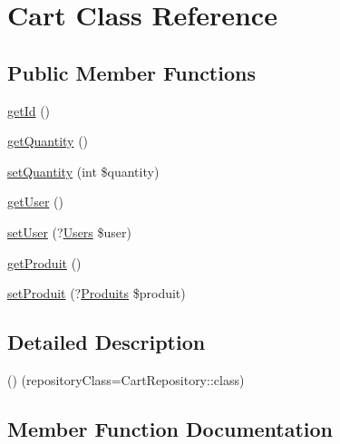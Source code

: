 \hypertarget{class_app_1_1_entity_1_1_cart}{}\section{Cart Class Reference}
\label{class_app_1_1_entity_1_1_cart}
\subsection*{Public Member Functions}
\begin{DoxyCompactItemize}
\item 
\mbox{\hyperlink{class_app_1_1_entity_1_1_cart_a12251d0c022e9e21c137a105ff683f13}{get\+Id}} ()
\item 
\mbox{\hyperlink{class_app_1_1_entity_1_1_cart_abae8ce0df3d9f49efcba4904a2d030a6}{get\+Quantity}} ()
\item 
\mbox{\hyperlink{class_app_1_1_entity_1_1_cart_a6aaf2dab8685fde29dbdf49b782017df}{set\+Quantity}} (int \$quantity)
\item 
\mbox{\hyperlink{class_app_1_1_entity_1_1_cart_ae81b7186fb97a7c6457edcc68c9aa2ef}{get\+User}} ()
\item 
\mbox{\hyperlink{class_app_1_1_entity_1_1_cart_a31170564fe4585dda0eb916f17323681}{set\+User}} (?\mbox{\hyperlink{class_app_1_1_entity_1_1_users}{Users}} \$user)
\item 
\mbox{\hyperlink{class_app_1_1_entity_1_1_cart_aa39b956895038a1e65f2a0ca81fd3398}{get\+Produit}} ()
\item 
\mbox{\hyperlink{class_app_1_1_entity_1_1_cart_aee1aa682ba8a05574c94b12e4a4bbc73}{set\+Produit}} (?\mbox{\hyperlink{class_app_1_1_entity_1_1_produits}{Produits}} \$produit)
\end{DoxyCompactItemize}


\subsection{Detailed Description}
() (repository\+Class=Cart\+Repository\+::class) 

\subsection{Member Function Documentation}
\mbox{\label{class_app_1_1_entity_1_1_cart_a12251d0c022e9e21c137a105ff683f13}} 
